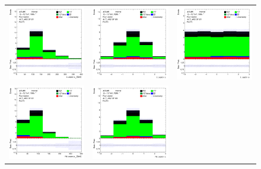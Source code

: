 \begin{figure}[htbp]
  \begin{tabular}{ccc}


    \includegraphics[width=.3\textwidth]{figures/PreFitPlots/lep4_tWZ_4T_OF_L_lepton_pt.png} &
    \includegraphics[width=.3\textwidth]{figures/PreFitPlots/lep4_tWZ_4T_OF_L_lepton_eta.png} &
    \includegraphics[width=.3\textwidth]{figures/PreFitPlots/lep4_tWZ_4T_OF_L_lepton_phi.png} \\
    \includegraphics[width=.3\textwidth]{figures/PreFitPlots/lep4_tWZ_4T_OF_NL_lepton_pt.png} &
    \includegraphics[width=.3\textwidth]{figures/PreFitPlots/lep4_tWZ_4T_OF_NL_lepton_eta.png} &

\end{tabular}
\end{figure}
